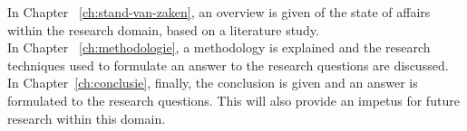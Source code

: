 In Chapter ~\ref{ch:stand-van-zaken}, an overview is given of the state of affairs within the research domain, based on a literature study.\\

In Chapter ~\ref{ch:methodologie}, a methodology is explained and the research techniques used to formulate an answer to the research questions are discussed.\\


In Chapter~\ref{ch:conclusie}, finally, the conclusion is given and an answer is formulated to the research questions. This will also provide an impetus for future research within this domain.\\
